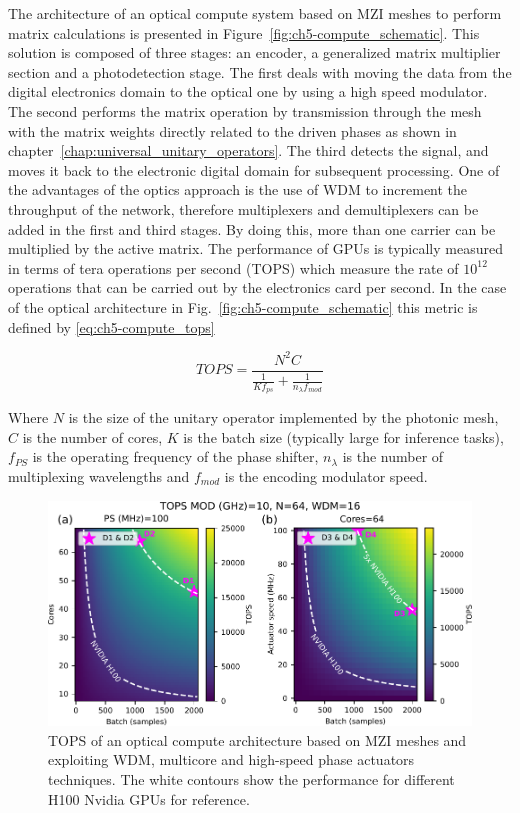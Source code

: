The architecture of an optical compute system based on MZI meshes to perform matrix calculations is presented in Figure~\ref{fig:ch5-compute_schematic}.
This solution is composed of three stages: an encoder, a generalized matrix multiplier section and a photodetection stage.
The first deals with moving the data from the digital electronics domain to the optical one by using a high speed modulator.
The second performs the matrix operation by transmission through the mesh with the matrix weights directly related to the driven phases as shown in chapter~\ref{chap:universal_unitary_operators}.
The third detects the signal, and moves it back to the electronic digital domain for subsequent processing.
One of the advantages of the optics approach is the use of WDM to increment the throughput of the network, therefore multiplexers and demultiplexers can be added in the first and third stages.
By doing this, more than one carrier can be multiplied by the active matrix.
The performance of GPUs is typically measured in terms of tera operations per second (TOPS) which measure the rate of \(10^{12}\) operations that can be carried out by the electronics card per second.
In the case of the optical architecture in Fig.~\ref{fig:ch5-compute_schematic} this metric is defined by \eqref{eq:ch5-compute_tops}

\begin{equation}
	TOPS = \frac{N^2 C}{\frac{1}{K f_{ps}}+\frac{1}{n_{\lambda}f_{mod}}} \label{eq:ch5-compute_tops} \end{equation}

Where \(N\) is the size of the unitary operator implemented by the photonic mesh, \(C\) is the number of cores, \(K\) is the batch size (typically large for inference tasks), \(f_{PS}\) is the operating frequency of the phase shifter, \(n_{\lambda}\) is the number of multiplexing wavelengths and \(f_{mod}\) is the encoding modulator speed.

\begin{figure}[h]
	\begin{center}
		\includegraphics{figures/ch5-compute_tops_batchs.pdf}
	\end{center}
	\caption{TOPS of an optical compute architecture based on MZI meshes and exploiting WDM, multicore and high-speed phase actuators techniques.
		The white contours show the performance for different H100 Nvidia GPUs for reference.
	}\label{fig:ch5-compute_tops}
\end{figure}

